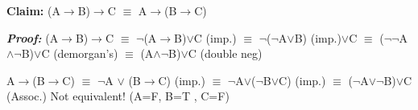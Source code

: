 \documentclass{article}
\begin{document}
\textbf{Claim: }(A$\rightarrow$B)$\rightarrow$C $\equiv$ A$\rightarrow$(B$\rightarrow$C)\newline

\textbf{\textit{Proof: }}\newline
(A$\rightarrow$B)$\rightarrow$C $\equiv$ $\neg$(A$\rightarrow$B)$\lor$C (imp.)\newline
	$\equiv$ $\neg$($\neg$A$\lor$B) (imp.)$\lor$C\newline
	$\equiv$ ($\neg$$\neg$A$\wedge$$\neg$B)$\lor$C (demorgan's)\newline
	$\equiv$ (A$\wedge$$\neg$B)$\lor$C (double neg)\newline

A$\rightarrow$(B$\rightarrow$C) $\equiv$ $\neg$A $\lor$ (B$\rightarrow$C) (imp.)\newline
	$\equiv$ $\neg$A$\lor$($\neg$B$\lor$C) (imp.)\newline
	$\equiv$ ($\neg$A$\lor$$\neg$B)$\lor$C (Assoc.)\newline
Not equivalent! (A=F, B=T , C=F)
\end{document}
